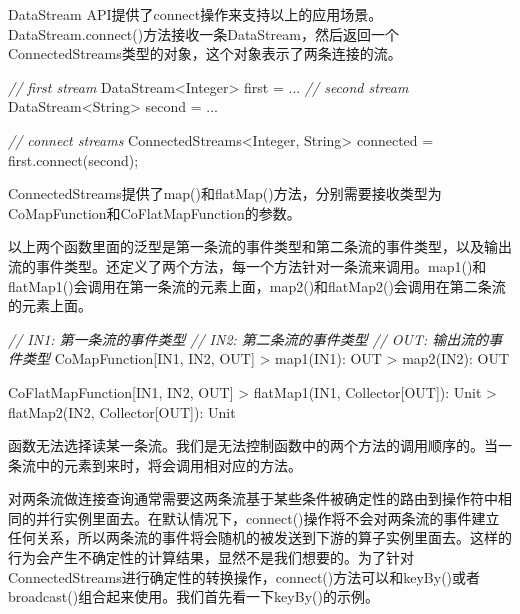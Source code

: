 \documentclass[cn,11pt,chinese]{elegantbook}
\newenvironment{Shaded}{}{}
\newcommand{\BuiltInTok}[1]{#1}
\newcommand{\CommentTok}[1]{\textcolor[rgb]{0.38,0.63,0.69}{\textit{#1}}}
\newcommand{\FunctionTok}[1]{\textcolor[rgb]{0.02,0.16,0.49}{#1}}
\newcommand{\NormalTok}[1]{#1}
\renewenvironment{quote}{\begin{customblockquote}\list{}{\rightmargin=0em\leftmargin=0em}%
\item\relax\color{blockquote-text}\ignorespaces}{\unskip\unskip\endlist\end{customblockquote}}
\begin{document}
DataStream
API提供了connect操作来支持以上的应用场景。DataStream.connect()方法接收一条DataStream，然后返回一个ConnectedStreams类型的对象，这个对象表示了两条连接的流。

\begin{Shaded}
\begin{Highlighting}[]
\CommentTok{// first stream}
\NormalTok{DataStream\textless{}}\BuiltInTok{Integer}\NormalTok{\textgreater{} first = ...}
\CommentTok{// second stream}
\NormalTok{DataStream\textless{}}\BuiltInTok{String}\NormalTok{\textgreater{} second = ...}

\CommentTok{// connect streams}
\NormalTok{ConnectedStreams\textless{}}\BuiltInTok{Integer}\NormalTok{, }\BuiltInTok{String}\NormalTok{\textgreater{} connected = first.}\FunctionTok{connect}\NormalTok{(second);}
\end{Highlighting}
\end{Shaded}

ConnectedStreams提供了map()和flatMap()方法，分别需要接收类型为CoMapFunction和CoFlatMapFunction的参数。

以上两个函数里面的泛型是第一条流的事件类型和第二条流的事件类型，以及输出流的事件类型。还定义了两个方法，每一个方法针对一条流来调用。map1()和flatMap1()会调用在第一条流的元素上面，map2()和flatMap2()会调用在第二条流的元素上面。

\begin{Shaded}
\begin{Highlighting}[]
\CommentTok{// IN1: 第一条流的事件类型}
\CommentTok{// IN2: 第二条流的事件类型}
\CommentTok{// OUT: 输出流的事件类型}
\NormalTok{CoMapFunction[IN1, IN2, OUT]}
\NormalTok{    \textgreater{} }\FunctionTok{map1}\NormalTok{(IN1): OUT}
\NormalTok{    \textgreater{} }\FunctionTok{map2}\NormalTok{(IN2): OUT}

\NormalTok{CoFlatMapFunction[IN1, IN2, OUT]}
\NormalTok{    \textgreater{} }\FunctionTok{flatMap1}\NormalTok{(IN1, Collector[OUT]): Unit}
\NormalTok{    \textgreater{} }\FunctionTok{flatMap2}\NormalTok{(IN2, Collector[OUT]): Unit}
\end{Highlighting}
\end{Shaded}

\begin{quote}
函数无法选择读某一条流。我们是无法控制函数中的两个方法的调用顺序的。当一条流中的元素到来时，将会调用相对应的方法。
\end{quote}

对两条流做连接查询通常需要这两条流基于某些条件被确定性的路由到操作符中相同的并行实例里面去。在默认情况下，connect()操作将不会对两条流的事件建立任何关系，所以两条流的事件将会随机的被发送到下游的算子实例里面去。这样的行为会产生不确定性的计算结果，显然不是我们想要的。为了针对ConnectedStreams进行确定性的转换操作，connect()方法可以和keyBy()或者broadcast()组合起来使用。我们首先看一下keyBy()的示例。
\end{document}
